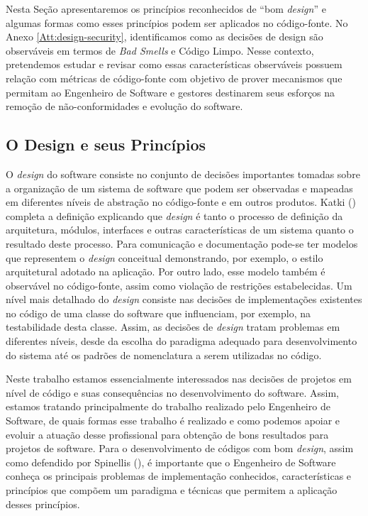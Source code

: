 %

Nesta Seção apresentaremos os princípios reconhecidos de ``bom \emph{design}'' e algumas formas como esses princípios podem ser aplicados no código-fonte. No Anexo \ref{Att:design-security}, identificamos como as decisões de design são observáveis em termos de \emph{Bad Smells} e Código Limpo.
%
Nesse contexto, pretendemos estudar e revisar como essas características observáveis possuem relação com métricas de código-fonte com objetivo de prover mecanismos que permitam ao Engenheiro de Software e gestores destinarem seus esforços na remoção de não-conformidades e evolução do software.

\subsection{O Design e seus Princípios}
\label{sec-principles-practises}

O \emph{design} do software consiste no conjunto de decisões importantes tomadas sobre a organização de um sistema de software que podem ser observadas e mapeadas em diferentes níveis de abstração no código-fonte e em outros produtos.
%
Katki (\citeyear{katki1991}) completa a definição explicando que \emph{design} é tanto o processo de definição da arquitetura, módulos, interfaces e outras características de um sistema quanto o resultado deste processo.
%
Para comunicação e documentação pode-se ter modelos que representem o \emph{design} conceitual demonstrando, por exemplo, o estilo arquitetural adotado na aplicação.
%
Por outro lado, esse modelo também é observável no código-fonte, assim como violação de restrições estabelecidas. Um nível mais detalhado do \emph{design} consiste nas decisões de implementações existentes no código de uma classe do software que influenciam, por exemplo, na testabilidade desta classe. Assim, as decisões de \emph{design} tratam problemas em diferentes níveis, desde da escolha do paradigma adequado para desenvolvimento do sistema até os padrões de nomenclatura a serem utilizadas no código.


Neste trabalho estamos essencialmente interessados nas decisões de projetos em nível de código e suas consequências no desenvolvimento do software.
%
Assim, estamos tratando principalmente do trabalho realizado pelo Engenheiro de Software, de quais formas esse trabalho é realizado e como podemos apoiar e evoluir a atuação desse profissional para obtenção de bons resultados para projetos de software.
%
Para o desenvolvimento de códigos com bom \emph{design}, assim como defendido por Spinellis (\citeyear{spinellis2006}), é importante que o Engenheiro de Software conheça os principais problemas de implementação conhecidos, características e princípios que compõem um paradigma e técnicas que permitem a aplicação desses princípios.

